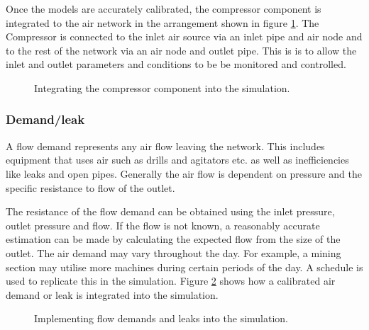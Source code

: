 		\par
		Once the models are accurately calibrated, the compressor component is integrated to the air network in the arrangement shown in figure \ref{fig: Compressor models}. The Compressor is connected to the inlet air source via an inlet pipe and air node and to the rest of the network via an air node and outlet pipe. This is is to allow the inlet and outlet parameters and conditions to be be monitored and controlled.
		\begin{figure}[h]
			\centering
			\caption{Integrating the compressor component into the simulation.}
			\label{fig: Compressor models}
		\end{figure}		

		\subsubsection{Demand/leak}
			A flow demand represents any air flow leaving the network. This includes equipment that uses air such as drills and agitators etc. as well as inefficiencies like leaks and open pipes. Generally the air flow is dependent on pressure and the specific resistance to flow of the outlet. 
			\par 
			The resistance of the flow demand can be obtained using the inlet pressure, outlet pressure and flow. If the flow is not known, a reasonably accurate estimation can be made by calculating the expected flow from the size of the outlet. The air demand may vary throughout the day. For example, a mining section may utilise more machines during certain periods of the day. A schedule is used to replicate this in the simulation. Figure \ref{fig: Demand component} shows how a calibrated air demand or leak is integrated into the simulation.
			
			\begin{figure}[h]
				\centering
				\caption{Implementing flow demands and leaks into the simulation.} 
				\label{fig: Demand component}
			\end{figure}
